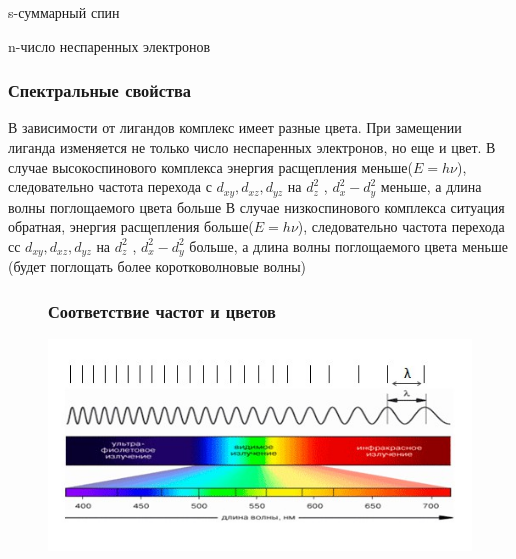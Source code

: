 s-суммарный спин 

n-число неспаренных электронов 

\subsubsection*{Спектральные свойства}
 В зависимости от лигандов комплекс имеет разные цвета. При замещении лиганда изменяется не только число неспаренных электронов, но еще и цвет. В случае высокоспинового комплекса энергия расщепления меньше($E=h\nu$), следовательно частота перехода с $d_{xy},d_{xz},d_{yz}$ на $d_z^2$ , $d_x^2-d_y^2$ меньше, а длина волны поглощаемого цвета больше В случае низкоспинового комплекса ситуация обратная, энергия расщепления больше($E=h\nu$), следовательно частота перехода сс $d_{xy},d_{xz},d_{yz}$ на $d_z^2$ , $d_x^2-d_y^2$ больше, а длина волны поглощаемого цвета меньше (будет поглощать более коротковолновые волны) \begin{figure}[htp]
 
\subsubsection*{Соответствие частот и цветов}
\centering
\includegraphics[scale=.750]{images/spectre.jpg}
\end{figure}
 
 